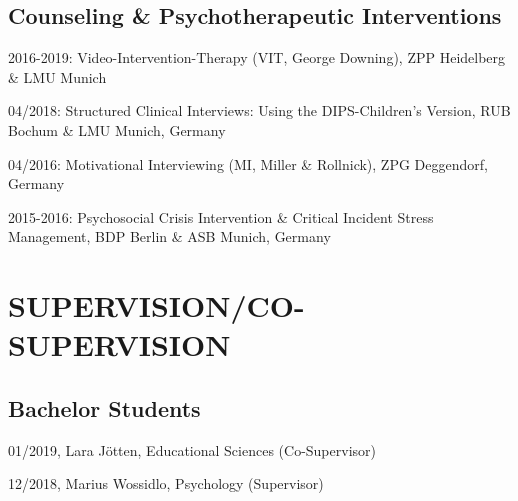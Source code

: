 \documentclass[letterpaper]{article}
\renewenvironment{itemize}{ %
  \begin{list}{}{ %
    \setlength{\leftmargin}{2.5em} %
  }
}{
  \end{list}
}
\begin{document}
\subsection*{Counseling \& Psychotherapeutic Interventions}
\begin{itemize}
\item 2016-2019: Video-Intervention-Therapy (VIT, George Downing), ZPP Heidelberg \& LMU Munich
\item 04/2018: Structured Clinical Interviews: Using the DIPS-Children's Version, RUB Bochum \& LMU Munich, Germany
\item 04/2016: Motivational Interviewing (MI, Miller \& Rollnick), ZPG Deggendorf, Germany
\item 2015-2016: Psychosocial Crisis Intervention \& Critical Incident Stress Management, BDP Berlin \& ASB Munich, Germany
\end{itemize}


\section*{SUPERVISION/CO-SUPERVISION}
\subsection*{Bachelor Students}
\begin{itemize}
\item 01/2019, Lara Jötten, Educational Sciences (Co-Supervisor)
\item 12/2018, Marius Wossidlo, Psychology (Supervisor)
\end{itemize}
\end{document}
